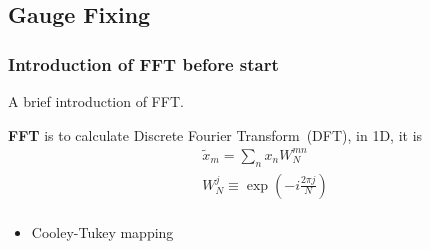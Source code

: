 \subsection{\label{sec:GaugeFixing}Gauge Fixing}

\subsubsection{\label{sec:FFT}Introduction of FFT before start}

A brief introduction of FFT.

\textbf{FFT} is to calculate Discrete Fourier Transform~(DFT), in 1D, it is
\begin{equation}
\begin{split}
&\tilde{x}_m=\sum _n x_nW_N^{mn}\\
&W_N^j\equiv \exp (-i\frac{2\pi j}{N})\\
\end{split}
\end{equation}

\begin{itemize}
  \item Cooley-Tukey mapping
\end{itemize}

